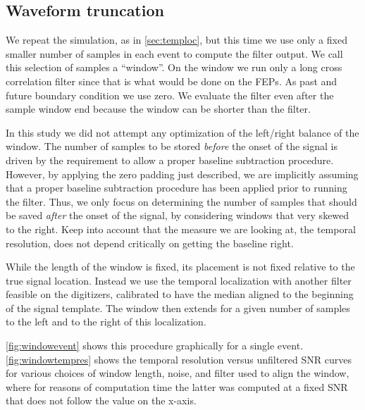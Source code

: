 \subsection{Waveform truncation}

We repeat the simulation, as in \autoref{sec:temploc}, but this time we use
only a fixed smaller number of samples in each event to compute the filter
output. We call this selection of samples a ``window''. On the window we run
only a long cross correlation filter since that is what would be done on the
FEPs. As past and future boundary condition we use zero. We evaluate the filter
even after the sample window end because the window can be shorter than the
filter.

In this study we did not attempt any optimization of the left/right balance of
the window. The number of samples to be stored \emph{before} the onset of the
signal is driven by the requirement to allow a proper baseline subtraction
procedure. However, by applying the zero padding just described, we are
implicitly assuming that a proper baseline subtraction procedure has been
applied prior to running the filter. Thus, we only focus on determining the
number of samples that should be saved \emph{after} the onset of the signal, by
considering windows that very skewed to the right. Keep into account that the
measure we are looking at, the temporal resolution, does not depend critically
on getting the baseline right.

While the length of the window is fixed, its placement is not fixed relative to
the true signal location. Instead we use the temporal localization with another
filter feasible on the digitizers, calibrated to have the median aligned to the
beginning of the signal template. The window then extends for a given number of
samples to the left and to the right of this localization.


\autoref{fig:windowevent} shows this procedure graphically for a single
event. \autoref{fig:windowtempres} shows the temporal resolution versus
unfiltered SNR curves for various choices of window length, noise, and filter
used to align the window, where for reasons of computation time the latter was
computed at a fixed SNR that does not follow the value on the x-axis.


\begin{figure}
    
    

\end{figure}

